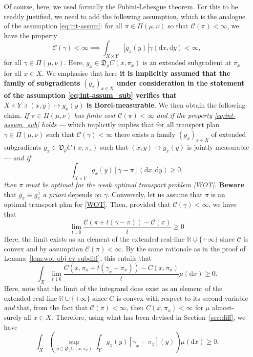 \documentclass[leqno, 11pt, a4paper]{amsart}
\theoremstyle{definition}
\newcommand{\R}{\mathbb{R}}
\newcommand{\C}{\mathscr{C}}
\newcommand{\dd}{\mathrm{d}}
\newcommand{\extendedR}{\R \cup \{+\infty\}}
\begin{document}
Of course, here, we used formally the Fubini-Lebesgue theorem. For this to be readily justified, we need to add the following assumption, which is the analogue of the assumption \eqref{eq:int-assum}: for all $\pi \in \Pi(\mu, \nu)$ so that $\C(\pi) < \infty$, we have the property
	\begin{equation}\label{eq:int-assum_sub}\tag{A'$_\pi$}
	\C(\gamma) < \infty \implies \int_{X \times Y} |g_x(y)| \gamma(\dd x, \dd y) < \infty,
\end{equation}
for all $\gamma \in \Pi(\mu, \nu)$. Here, $g_x \in \mathfrak{D}_\rho C(x, \pi_x)$ is an extended subgradient at $\pi_x$ for all $x \in X$. We emphasise that here \textbf{it is implicitly assumed that the family of subgradients $(g_x)_{x \in X}$ under consideration in the statement of the assumption \eqref{eq:int-assum_sub} verifies that $X \times Y \ni (x, y) \mapsto g_x(y)$ is Borel-measurable}. We then obtain the following claim. \textit{If $\pi \in \Pi(\mu, \nu)$ has finite cost $\C(\pi) < \infty$ and if the property \eqref{eq:int-assum_sub} holds} --- which implicitly implies that for all transport plan $\gamma \in \Pi(\mu, \nu)$ such that $\C(\gamma) < \infty$ there exists a family $(g_x)_{x \in X}$ of extended subgradients $g_x \in \mathfrak{D}_\rho C(x, \pi_x)$ such that $(x, y) \mapsto g_x(y)$ is jointly measurable --- \textit{and if}
\begin{equation}\label{eq:cond-opt-not-diff}
 \int_{X \times Y} g_x(y) [\gamma - \pi](\dd x,\dd y) \geq 0,
\end{equation}
\textit{then $\pi$ must be optimal for the weak optimal transport problem \eqref{WOT}.} \textbf{Beware} that $g_x \equiv g_x^\gamma$ \textit{a priori} depends on $\gamma$. Conversely, let us assume that $\pi$ is an optimal transport plan for \eqref{WOT}. Then, provided that $\C(\gamma) < \infty$, we have that 
$$
\lim_{t \downarrow 0} \frac{\C(\pi + t(\gamma - \pi)) - \C(\pi)}{t} \geq 0
$$
Here, the limit exists as an element of the extended real-line $\extendedR$ since $\C$ is convex and by assumption $\C(\pi) < \infty$. By the same rationale as in the proof of Lemma~\ref{lem:wot-obj-cv-subdiff}, this entails that 
$$
\int_{X} \lim_{t \downarrow 0} \frac{C(x, \pi_x + t(\gamma_x - \pi_x)) - C(x, \pi_x)}{t} \mu(\dd x) \geq 0.
$$
Here, note that the limit of the integrand does exist as an element of the extended real-line $\extendedR$ since $C$ is convex with respect to its second variable \textit{and} that, from the fact that $\C(\pi) < \infty$, then $C(x, \pi_x)<\infty$ for $\mu$ almost-surely all $x \in X$. Therefore, using what has been devised in Section~\ref{sec:diff}, we have
\begin{equation}\label{eq:nasty-sub}
\int_{X} \left(\sup_{g \in \mathfrak{D}_\rho C(x, \pi_x)} \int_{Y} g_x(y) [\gamma_x - \pi_x](y)\right) \mu(\dd x) \geq 0.
\end{equation}
\end{document}
